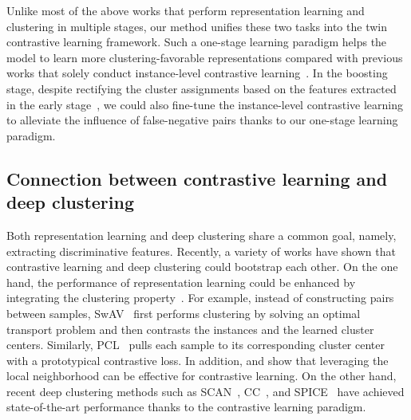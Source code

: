 Unlike most of the above works that perform representation learning and clustering in multiple stages, our method unifies these two tasks into the twin contrastive learning framework. Such a one-stage learning paradigm helps the model to learn more clustering-favorable representations compared with previous works that solely conduct instance-level contrastive learning~\citep{SCAN, SPICE}. In the boosting stage, despite rectifying the cluster assignments based on the features extracted in the early stage~\citep{SPICE}, we could also fine-tune the instance-level contrastive learning to alleviate the influence of false-negative pairs thanks to our one-stage learning paradigm.

\subsection{Connection between contrastive learning and deep clustering}

Both representation learning and deep clustering share a common goal, namely, extracting discriminative features. Recently, a variety of works have shown that contrastive learning and deep clustering could bootstrap each other. On the one hand, the performance of representation learning could be enhanced by integrating the clustering property~\citep{wang2021unsupervised}. For example, instead of constructing pairs between samples, SwAV~\citep{SWAV} first performs clustering by solving an optimal transport problem and then contrasts the instances and the learned cluster centers. Similarly, PCL~\citep{li2020prototypical} pulls each sample to its corresponding cluster center with a prototypical contrastive loss. In addition, \cite{van2021revisiting} and \cite{dwibedi2021little} show that leveraging the local neighborhood can be effective for contrastive learning. On the other hand, recent deep clustering methods such as SCAN~\citep{SCAN}, CC~\citep{CC}, and SPICE~\citep{SPICE} have achieved state-of-the-art performance thanks to the contrastive learning paradigm.

